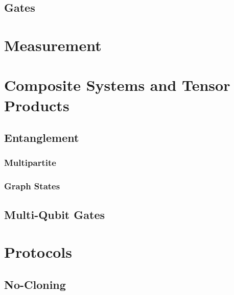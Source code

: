         \subsection{Gates} %

    \section{Measurement} %

    \section{Composite Systems and Tensor Products} %

        \subsection{Entanglement} %

            \subsubsection{Multipartite} %

            \subsubsection{Graph States} %

        \subsection{Multi-Qubit Gates} %

    \section{Protocols} %

        \subsection{No-Cloning} %

